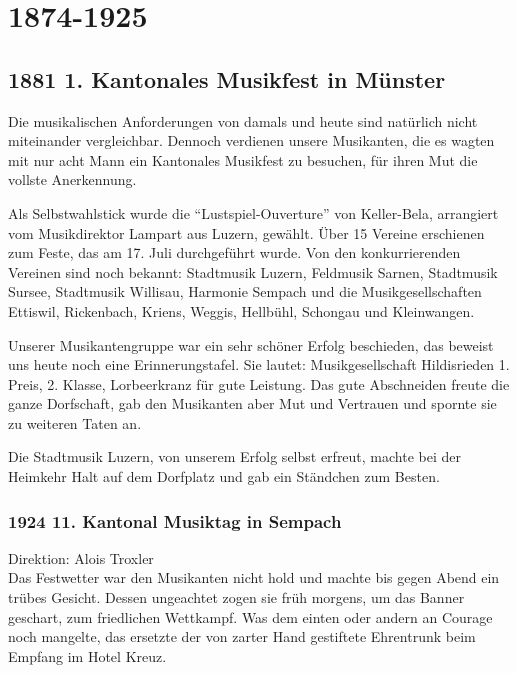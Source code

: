 \section{1874-1925}

\begin{history}

    \subsection{1881 1. Kantonales Musikfest in Münster}

    Die musikalischen Anforderungen von damals und heute sind natürlich nicht
    miteinander vergleichbar. Dennoch verdienen unsere Musikanten, die es wagten
    mit nur acht Mann ein Kantonales Musikfest zu besuchen, für ihren Mut die
    vollste Anerkennung.

    Als Selbstwahlstick wurde die \enquote{Lustspiel-Ouverture} von Keller-Bela,
    arrangiert vom Musikdirektor Lampart aus Luzern, gewählt. Über 15 Vereine
    erschienen zum Feste, das am 17. Juli durchgeführt wurde. Von den
    konkurrierenden Vereinen sind noch bekannt: Stadtmusik Luzern, Feldmusik
    Sarnen, Stadtmusik Sursee, Stadtmusik Willisau, Harmonie Sempach und die
    Musikgesellschaften Ettiswil, Rickenbach, Kriens, Weggis, Hellbühl, Schongau
    und Kleinwangen.

    Unserer Musikantengruppe war ein sehr schöner Erfolg beschieden, das beweist
    uns heute noch eine Erinnerungstafel. Sie lautet: Musikgesellschaft
    Hildisrieden 1. Preis, 2. Klasse, Lorbeerkranz für gute Leistung. Das gute
    Abschneiden freute die ganze Dorfschaft, gab den Musikanten aber Mut und
    Vertrauen und spornte sie zu weiteren Taten an.

    Die Stadtmusik Luzern, von unserem Erfolg selbst erfreut, machte bei der
    Heimkehr Halt auf dem Dorfplatz und gab ein Ständchen zum Besten.

    \subsubsection{1924 11. Kantonal Musiktag in Sempach}

    Direktion: Alois Troxler\\
    Das Festwetter war den Musikanten nicht hold und machte bis gegen Abend ein
    trübes Gesicht. Dessen ungeachtet zogen sie früh morgens, um das Banner
    geschart, zum friedlichen Wettkampf. Was dem einten oder andern an Courage
    noch mangelte, das ersetzte der von zarter Hand gestiftete Ehrentrunk beim
    Empfang im Hotel Kreuz.


\end{history}
